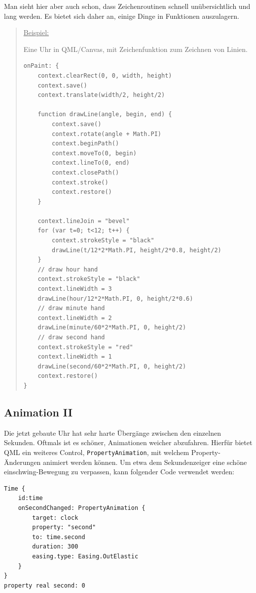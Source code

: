\documentclass[a4paper]{article}
\begin{document}
Man sieht hier aber auch schon, dass Zeichenroutinen schnell unübersichtlich und lang werden. Es bietet sich daher an, einige Dinge in Funktionen auszulagern.

\begin{quote}
\uline{Beispiel:}

Eine Uhr in QML/Canvas, mit Zeichenfunktion zum Zeichnen von Linien.

\begin{verbatim}
onPaint: {
    context.clearRect(0, 0, width, height)
    context.save()
    context.translate(width/2, height/2)

    function drawLine(angle, begin, end) {
        context.save()
        context.rotate(angle + Math.PI)
        context.beginPath()
        context.moveTo(0, begin)
        context.lineTo(0, end)
        context.closePath()
        context.stroke()
        context.restore()
    }

    context.lineJoin = "bevel"
    for (var t=0; t<12; t++) {
        context.strokeStyle = "black"
        drawLine(t/12*2*Math.PI, height/2*0.8, height/2)
    }
    // draw hour hand
    context.strokeStyle = "black"
    context.lineWidth = 3
    drawLine(hour/12*2*Math.PI, 0, height/2*0.6)
    // draw minute hand
    context.lineWidth = 2
    drawLine(minute/60*2*Math.PI, 0, height/2)
    // draw second hand
    context.strokeStyle = "red"
    context.lineWidth = 1
    drawLine(second/60*2*Math.PI, 0, height/2)
    context.restore()
}
\end{verbatim}
\end{quote}
\subsection{Animation II}
\label{sec-3-3}
Die jetzt gebaute Uhr hat sehr harte Übergänge zwischen den einzelnen Sekunden. Oftmals ist es schöner, Animationen weicher abzufahren. Hierfür bietet QML ein weiteres Control, \verb~PropertyAnimation~, mit welchem Property-Änderungen animiert werden können. Um etwa dem Sekundenzeiger eine schöne einschwing-Bewegung zu verpassen, kann folgender Code verwendet werden:

\begin{verbatim}
Time {
    id:time
    onSecondChanged: PropertyAnimation {
        target: clock
        property: "second"
        to: time.second
        duration: 300
        easing.type: Easing.OutElastic
    }
}
property real second: 0
\end{verbatim}
\end{document}
